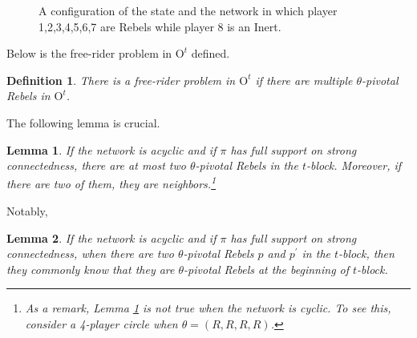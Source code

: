 \documentclass[12pt,letter]{article}
\newcommand{\Omicron}{\mathrm{O}}
\newtheorem{lemma}{Lemma}[section]
\newtheorem{definition}{Definition}[section]
\theoremstyle{definition}
\theoremstyle{remark}
\theoremstyle{claim}
\begin{document}
\begin{figure}
\caption{A configuration of the state and the network in which player 1,2,3,4,5,6,7 are Rebels while player 8 is an Inert.}
\label{fig:k-1_pivotal}
\begin{center}
\end{center}
\end{figure}

Below is the free-rider problem in $\Omicron^t$ defined.

\begin{definition}
There is a free-rider problem in $\Omicron^t$ if there are multiple $\theta$-pivotal Rebels in $\Omicron^t$.
\end{definition}



The following lemma is crucial. 
\begin{lemma}
\label{lemma_at_most_two_nodes}
If the network is acyclic and if $\pi$ has full support on strong connectedness, there are at most two $\theta$-pivotal Rebels in the $t$-block. Moreover, if there are two of them, they are neighbors.\footnote{As a remark, Lemma \ref{lemma_at_most_two_nodes} is not true when the network is cyclic. To see this, consider a 4-player circle when $\theta=(R,R,R,R)$.}
\end{lemma}

Notably,

\begin{lemma}
\label{lemman_pivotals_CK}
If the network is acyclic and if $\pi$ has full support on strong connectedness, when there are two $\theta$-pivotal Rebels $p$ and $p^{'}$ in the $t$-block, then they commonly know that they are $\theta$-pivotal Rebels at the beginning of $t$-block.
\end{lemma}
\end{document}
